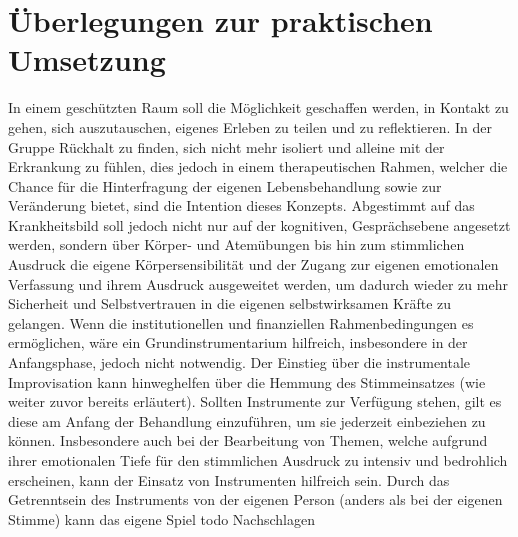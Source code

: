 \section{Überlegungen zur praktischen Umsetzung}
In einem geschützten Raum soll die Möglichkeit geschaffen werden, in Kontakt zu gehen, sich auszutauschen, eigenes Erleben zu teilen und zu reflektieren. In der Gruppe Rückhalt zu finden, sich nicht mehr isoliert und alleine mit der Erkrankung zu fühlen, dies jedoch in einem therapeutischen Rahmen, welcher die Chance für die Hinterfragung der eigenen Lebensbehandlung sowie zur Veränderung bietet, sind die Intention dieses Konzepts. Abgestimmt auf das Krankheitsbild soll jedoch nicht nur auf der kognitiven, Gesprächsebene angesetzt werden, sondern über Körper- und Atemübungen bis hin zum stimmlichen Ausdruck die eigene Körpersensibilität und der Zugang zur eigenen emotionalen Verfassung und ihrem Ausdruck ausgeweitet werden, um dadurch wieder zu mehr Sicherheit und Selbstvertrauen in die eigenen selbstwirksamen Kräfte zu gelangen. Wenn die institutionellen und finanziellen Rahmenbedingungen es ermöglichen, wäre ein Grundinstrumentarium hilfreich, insbesondere in der Anfangsphase, jedoch nicht notwendig. Der Einstieg über die instrumentale Improvisation kann hinweghelfen über die Hemmung des Stimmeinsatzes (wie weiter zuvor bereits erläutert). Sollten Instrumente zur Verfügung stehen, gilt es diese am Anfang der Behandlung einzuführen, um sie jederzeit einbeziehen zu können. Insbesondere auch bei der Bearbeitung von Themen, welche aufgrund ihrer emotionalen Tiefe für den stimmlichen Ausdruck zu intensiv und bedrohlich erscheinen, kann der Einsatz von Instrumenten hilfreich sein. Durch das Getrenntsein des Instruments von der eigenen Person (anders als bei der eigenen Stimme) kann das eigene Spiel todo Nachschlagen



